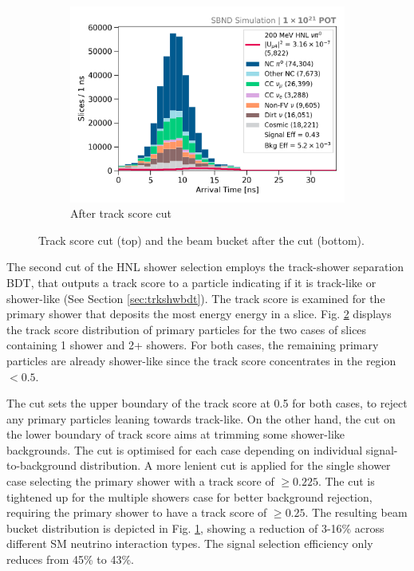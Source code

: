 \begin{figure}[ht!]
\begin{subfigure}[b]{0.495\textwidth}
            \includegraphics[width=\textwidth]{beam_bucket_postrackscore}
            \caption{After track score cut}%
	    \label{fig:bb_track_score}
        \end{subfigure}
	\caption[Track Score Cut]{
		Track score cut (top) and the beam bucket after the cut (bottom). 
	}
        \label{fig:track_score_cut}
\end{figure}

The second cut of the HNL shower selection employs the track-shower separation BDT, that outputs a track score to a particle indicating if it is track-like or shower-like (See Section \ref{sec:trkshwbdt}).
The track score is  examined for the primary shower that deposits the most energy energy in a slice.  
Fig. \ref{fig:track_score_cut} displays the track score distribution of primary particles for the two cases of slices containing 1 shower and 2+ showers.
For both cases, the remaining primary particles are already shower-like since the track score concentrates in the region $< 0.5$.


The cut sets the upper boundary of the track score at 0.5 for both cases, to reject any primary particles leaning towards track-like.
On the other hand, the cut on the lower boundary of track score aims at trimming some shower-like backgrounds.
The cut is optimised for each case depending on individual signal-to-background distribution.
A more lenient cut is applied for the single shower case selecting the primary shower with a track score of $\geq 0.225$.
The cut is tightened up for the multiple showers case for better background rejection, requiring the primary shower to have a track score of $\geq 0.25$.
The resulting beam bucket distribution is depicted in Fig. \ref{fig:bb_track_score}, showing a reduction of 3-16\% across different SM neutrino interaction types.
The signal selection efficiency only reduces from 45\% to 43\%.

